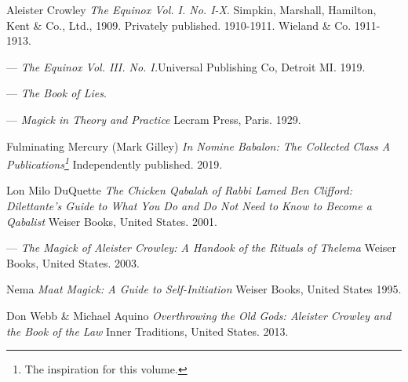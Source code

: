 \makeatletter
\renewcommand\@biblabel[1]{}
\makeatother
\renewcommand{\bibname}{Bibliography \& Additional Readings}
\begin{thebibliography}{10}
  Aleister Crowley
  \textit{The Equinox Vol. I. No. I-X}.\footnotemark
  Simpkin, Marshall, Hamilton, Kent \& Co., Ltd., 1909.
  Privately published. 1910-1911.
  Wieland \& Co. 1911-1913.

  ---
  \textit{The Equinox Vol. III. No. I.}\footnotemark[\value{footnote}]
  Universal Publishing Co, Detroit MI. 1919.

  ---
  \textit{The Book of Lies}.

  ---
  \textit{Magick in Theory and Practice}\footnotemark[\value{footnote}]
  Lecram Press, Paris. 1929.


  Fulminating Mercury (Mark Gilley)
  \textit{In Nomine Babalon: The Collected Class A Publications\footnote{The inspiration for this volume.}}
  Independently published. 2019.

  Lon Milo DuQuette
  \textit{The Chicken Qabalah of Rabbi Lamed Ben Clifford: Dilettante's Guide to What You Do and Do Not Need to Know to Become a Qabalist}\footnotemark
  Weiser Books, United States. 2001.

  ---
  \textit{The Magick of Aleister Crowley: A Handook of the Rituals of Thelema}\footnotemark[\value{footnote}]
  Weiser Books, United States. 2003.

  Nema
  \textit{Maat Magick: A Guide to Self-Initiation}
  Weiser Books, United States 1995.

  Don Webb \& Michael Aquino
  \textit{Overthrowing the Old Gods: Aleister Crowley and the Book of the Law}
  Inner Traditions, United States. 2013.
\end{thebibliography}

